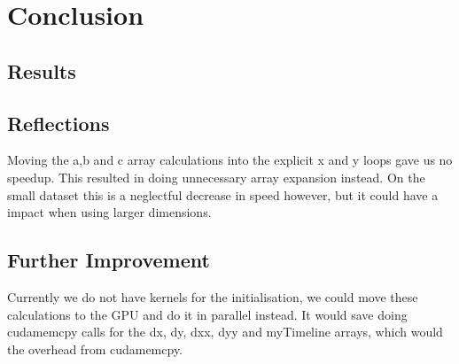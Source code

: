\section{Conclusion}
\subsection{Results}
\subsection{Reflections}
Moving the a,b and c array calculations into the explicit x and y loops gave us no speedup. This resulted in doing unnecessary  array expansion instead. On the small dataset this is a neglectful decrease in speed however, but it could have a impact when using larger dimensions. 

\subsection{Further Improvement}
Currently we do not have kernels for the initialisation, we could move these calculations to the GPU and do it in parallel instead. It would save doing cudamemcpy calls for the dx, dy, dxx, dyy and myTimeline arrays, which would the overhead from cudamemcpy.